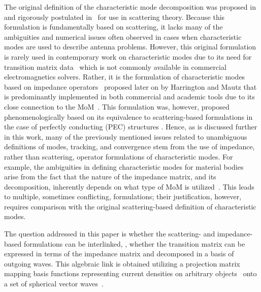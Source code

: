\documentclass[journal]{IEEEtran}
\begin{document}
The original definition of the characteristic mode decomposition was proposed in~\cite{1948_Montgomery_Principles_of_Microwave_Circuits} and rigorously postulated in~\cite{Garbacz_TCMdissertation,GarbaczTurpin_AGeneralizedExpansionForRadiatedAndScatteredFields} for use in scattering theory.  Because this formulation is fundamentally based on scattering, it lacks many of the ambiguities and numerical issues often observed in cases when characteristic modes are used to describe antenna problems. However, this original formulation
is rarely used in contemporary work on characteristic modes due to its need for transition matrix data~\cite{Kristensson_ScatteringBook,MishchenkoTravis_TMatrixComputationsofLightScatteringbyNonsphericalParticlesReview} which is not commonly available in commercial electromagnetics solvers. Rather, it is the formulation of characteristic modes based on impedance operators~\cite{HarringtonMautz_TheoryOfCharacteristicModesForConductingBodies, Harrington_AntennaExcitationForMaximumGain} proposed later on by Harrington and Mautz that is predominantly implemented in both commercial and academic tools due to its close connection to the \ac{MoM}~\cite{Harrington_FieldComputationByMoM,HarringtonMautz_ComputationOfCharacteristicModesForConductingBodies}.  This formulation was, however, proposed phenomenologically based on its equivalence to scattering-based formulations in the case of perfectly conducting (PEC) structures \cite{HarringtonMautz_TheoryOfCharacteristicModesForConductingBodies}. Hence, as is discussed further in this work, many of the previously mentioned issues related to unambiguous definitions of modes, tracking, and convergence stem from the use of impedance, rather than scattering, operator formulations of characteristic modes. For example, the ambiguities in defining characteristic modes for material bodies arise from the fact that the nature of the impedance matrix, and its decomposition, inherently depends on what type of \ac{MoM} is utilized~\cite{Gibson_MoMinElectromagnetics, VolakisSertel_IntegralEquationMethodsForElectromagnetics, ChewTongHu_IntegralEquationMethodsForElectromagneticAndElasticWaves, Wang_GeneralizedMoM, KolundzijaDjordjevic_EMofCompositeMaterials}. This leads to multiple, sometimes conflicting, formulations; their justification, however, requires comparison with the original scattering-based definition of characteristic modes.

The question addressed in this paper is whether the scattering- and impedance-based formulations can be interlinked, \ie{}, whether the transition matrix can be expressed in terms of the impedance matrix and decomposed in a basis of outgoing waves.  This algebraic link is obtained utilizing a projection matrix~\cite{TayliEtAl_AccurateAndEfficientEvaluationofCMs} mapping basis functions representing current densities on arbitrary objects~\cite{PetersonRayMittra_ComputationalMethodsForElectromagnetics} onto a set of spherical vector waves~\cite{Kristensson_ScatteringBook}.
\end{document}
